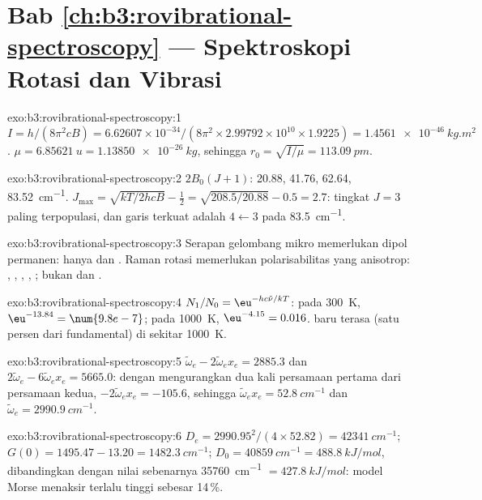 \section*{Bab \ref{ch:b3:rovibrational-spectroscopy} --- Spektroskopi Rotasi dan Vibrasi}

\begin{solution}{exo:b3:rovibrational-spectroscopy:1}
$I = h/(8\pi^2cB) = 6.62607 \times 10^{-34}/(8\pi^2 \times 2.99792 \times 10^{10} \times
1.9225) = \qty{1.4561e-46}{kg.m^2}$. $\mu = \qty{6.85621}{u} = \qty{1.13850e-26}{kg}$,
sehingga $r_0 = \sqrt{I/\mu} = \qty{113.09}{pm}$.
\end{solution}

\begin{solution}{exo:b3:rovibrational-spectroscopy:2}
$2B_0(J+1)$: 20.88, 41.76, 62.64, \qty{83.52}{cm^{-1}}. $J_{\max} = \sqrt{kT/2hcB} -
\frac12 = \sqrt{208.5/20.88} - 0.5 = 2.7$: tingkat $J = 3$ paling terpopulasi,
dan garis terkuat adalah $4 \leftarrow 3$ pada \qty{83.5}{cm^{-1}}.
\end{solution}

\begin{solution}{exo:b3:rovibrational-spectroscopy:3}
Serapan gelombang mikro memerlukan dipol permanen: hanya  dan
. Raman rotasi memerlukan polarisabilitas yang anisotrop: ,
, , , ; bukan   dan .
\end{solution}

\begin{solution}{exo:b3:rovibrational-spectroscopy:4}
$N_1/N_0 = \eu^{-hc\tilde\nu/kT}$: pada \qty{300}{K}, $\eu^{-13.84} = \num{9.8e-7}$;
pada \qty{1000}{K}, $\eu^{-4.15} = 0.016$.  baru terasa (satu persen
dari fundamental) di sekitar \qty{1000}{K}.
\end{solution}

\begin{solution}{exo:b3:rovibrational-spectroscopy:5}
$\tilde\omega_e - 2\tilde\omega_ex_e = 2885.3$ dan $2\tilde\omega_e - 6\tilde\omega_ex_e =
5665.0$: dengan mengurangkan dua kali persamaan pertama dari persamaan kedua,
$-2\tilde\omega_ex_e = -105.6$, sehingga $\tilde\omega_ex_e = \qty{52.8}{cm^{-1}}$ dan
$\tilde\omega_e = \qty{2990.9}{cm^{-1}}$.
\end{solution}

\begin{solution}{exo:b3:rovibrational-spectroscopy:6}
$D_e = 2990.95^2/(4 \times 52.82) = \qty{42341}{cm^{-1}}$; $G(0) = 1495.47 - 13.20 =
\qty{1482.3}{cm^{-1}}$; $D_0 = \qty{40859}{cm^{-1}} = \qty{488.8}{kJ/mol}$, dibandingkan
dengan nilai sebenarnya \qty{35760}{cm^{-1}} $= \qty{427.8}{kJ/mol}$: model Morse
menaksir terlalu tinggi sebesar 14\,\%.
\end{solution}

